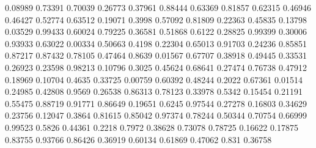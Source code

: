\documentclass{article}
\newenvironment{eulernotebook}{\par}{\par}
\newenvironment{eulercomment}{\par\medskip}{\par\medskip}
\begin{document}
\begin{eulernotebook}
\begin{eulercomment}
\begin{eulercomment}
\begin{eulercomment}
\begin{eulercomment}
\begin{eulercomment}
\begin{eulercomment}
\begin{euleroutput}
              0.08989
              0.73391
              0.70039
              0.26773
              0.37961
              0.88444
              0.63369
              0.81857
              0.62315
              0.46946
              0.46427
              0.52774
              0.63512
              0.19071
               0.3998
              0.57092
              0.81809
              0.22363
              0.45835
              0.13798
              0.03529
              0.99433
              0.60024
              0.79225
              0.36581
              0.51868
               0.6122
              0.28825
              0.99399
              0.30006
              0.93933
              0.63022
              0.00334
              0.50663
               0.4198
              0.22304
              0.65013
              0.91703
              0.24236
              0.85851
              0.87217
              0.87432
              0.78105
              0.47464
               0.8639
              0.01567
              0.67707
              0.38918
              0.49445
              0.33531
              0.26923
              0.23598
              0.98213
              0.10796
               0.3025
              0.45624
              0.68641
              0.27474
              0.76738
              0.47912
              0.18969
              0.10704
               0.4635
              0.33725
              0.00759
              0.60392
              0.48244
               0.2022
              0.67361
              0.01514
              0.24985
              0.42808
               0.9569
              0.26538
              0.86313
              0.78123
              0.33978
               0.5342
              0.15454
              0.21191
              0.55475
              0.88719
              0.91771
              0.86649
              0.19651
               0.6245
              0.97544
              0.27278
              0.16803
              0.34629
              0.23756
              0.12047
               0.3864
              0.81615
              0.85042
              0.97374
              0.78244
              0.50344
              0.70754
              0.66999
              0.99523
               0.5826
              0.44361
               0.2218
               0.7972
              0.38628
              0.73078
              0.78725
              0.16622
              0.17875
              0.83755
              0.93766
              0.86426
              0.36919
              0.60134
              0.61869
              0.47062
                0.831
              0.36758

\end{euleroutput}
\end{eulercomment}
\end{eulercomment}
\end{eulercomment}
\end{eulercomment}
\end{eulercomment}
\end{eulercomment}
\end{eulernotebook}
\end{document}

